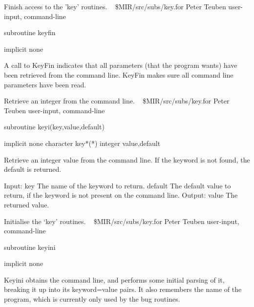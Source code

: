 %
\noindent Finish access to the 'key' routines.
\newline \ 
\newline {} \$MIR/src/subs/key.for
\newline {} Peter Teuben
\newline {} user-input, command-line
\par{\tenpoint
{\eightpoint\begintt
        subroutine keyfin

        implicit none

  A call to KeyFin indicates that all parameters (that the program wants)
  have been retrieved from the command line. KeyFin makes sure all
  command line parameters have been read.
\endtt}
\par}
%
\noindent Retrieve an integer from the command line.
\newline \ 
\newline {} \$MIR/src/subs/key.for
\newline {} Peter Teuben
\newline \abox{Keywords:} user-input, command-line
\par{\tenpoint
{\eightpoint\begintt
        subroutine keyi(key,value,default)

        implicit none
        character key*(*)
        integer value,default

  Retrieve an integer value from the command line. If the keyword is
  not found, the default is returned.

  Input:
    key        The name of the keyword to return.
    default    The default value to return, if the keyword is not present
               on the command line.
  Output:
    value      The returned value.
\endtt}
\par}
%
\noindent Initialise the `key' routines.
\newline \ 
\newline {} \$MIR/src/subs/key.for
\newline \abox{Responsible:} Peter Teuben
\newline {} user-input, command-line
\par{\tenpoint
{\eightpoint\begintt
        subroutine keyini

        implicit none

  Keyini obtains the command line, and performs some initial parsing
  of it, breaking it up into its keyword=value pairs.
  It also remembers the name of the program, which is currently only
  used by the bug routines.
\endtt}
\par}
